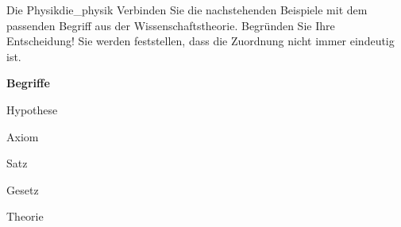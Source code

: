 \documentclass[ngerman]{scrreprt}
\begin{document}
\begin{aufgabebox}{Die Physik}{die_physik}
Verbinden Sie die nachstehenden Beispiele mit dem passenden Begriff aus der Wissenschaftstheorie. Begründen Sie Ihre Entscheidung! Sie werden feststellen, dass die Zuordnung nicht immer eindeutig ist.

\medskip\medskip\noindent\textbf{Begriffe}\par\medskip
\begin{tcbraster}[raster rows=1, raster columns=5]
    \begin{termbox}Hypothese\end{termbox}
    \begin{termbox}Axiom\end{termbox}
    \begin{termbox}Satz\end{termbox}
    \begin{termbox}Gesetz\end{termbox}
    \begin{termbox}Theorie\end{termbox}
\end{tcbraster}


\end{aufgabebox}
\end{document}
